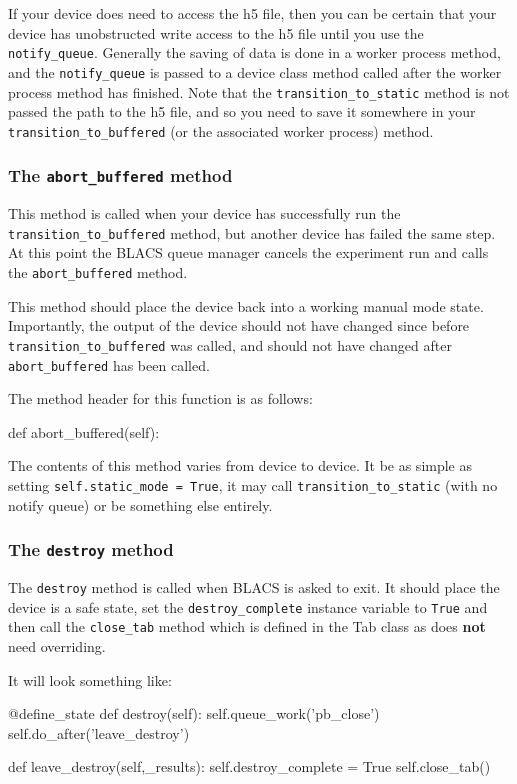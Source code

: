 \documentclass[12pt]{article}
\begin{document}
If your device does need to access the h5 file, then you can be certain that your device has unobstructed write access to the h5 file until you use the \texttt{notify\_queue}. Generally the saving of data is done in a worker process method, and the \texttt{notify\_queue} is passed to a device class method called after the worker process method has finished. Note that the \texttt{transition\_to\_static} method is not passed the path to the h5 file, and so you need to save it somewhere in your \texttt{transition\_to\_buffered} (or the  associated worker process) method.

\subsubsection{The \texttt{abort\_buffered} method}\label{device_class_abort_buffered}
This method is called when your device has successfully run the \texttt{transition\_to\_buffered} method, but another device has failed the same step. At this point the BLACS queue manager cancels the experiment run and calls the \texttt{abort\_buffered} method. 

This method should place the device back into a working manual mode state. Importantly, the output of the device should not have changed since before \texttt{transition\_to\_buffered} was called, and should not have changed after \texttt{abort\_buffered} has been called.

The method header for this function is as follows:
\begin{python}
    def abort_buffered(self):
\end{python}

The contents of this method varies from device to device. It be as simple as setting \texttt{self.static\_mode = True}, it may call \texttt{transition\_to\_static} (with no notify queue) or be something else entirely.

\subsubsection{The \texttt{destroy} method}\label{device_class_destroy}
The \texttt{destroy} method is called when BLACS is asked to exit. It should place the device is a safe state, set the \texttt{destroy\_complete} instance variable to \texttt{True} and then call the \texttt{close\_tab} method which is defined in the Tab class as does \textbf{not} need overriding. 

It will look something like:
\begin{python}
    @define_state
    def destroy(self):        
        self.queue_work('pb_close')
        self.do_after('leave_destroy')
        
    def leave_destroy(self,_results):
        self.destroy_complete = True
        self.close_tab()
\end{python}
\end{document}
